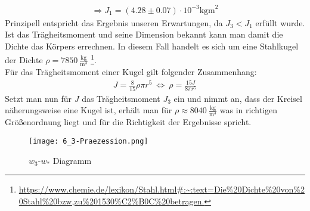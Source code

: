 \begin{align*}
    \Rightarrow\boxed{J_1=(4.28\pm0.07)\cdot10^{-3}\text{kgm}^2}
\end{align*}
Prinzipell entspricht das Ergebnis unseren Erwartungen, da $J_3<J_1$ erfüllt wurde. Ist das Trägheitsmoment und seine Dimension bekannt kann man damit die Dichte das Körpers errechnen. In diesem Fall handelt es sich um eine Stahlkugel der Dichte $\rho = 7850~\frac{\text{kg}}{\text{m}^3}$ \footnote{\url{https://www.chemie.de/lexikon/Stahl.html#:~:text=Die%20Dichte%20von%20Stahl%20bzw,zu%201530%C2%B0C%20betragen.}}.\\
Für das Trägheitsmoment einer Kugel gilt folgender Zusammenhang:
\begin{align}
    J=\frac{8}{15}\rho\pi r^5 ~\Leftrightarrow~ \rho=\frac{15 J}{8\pi r^5}
\end{align}
Setzt man nun für $J$ das Trägheitsmoment $J_3$ ein und nimmt an, dass der Kreisel näherungsweise eine Kugel ist, erhält man für $\rho\approx8040~\frac{\text{kg}}{\text{m}^3}$ was in richtigen Größenordnung liegt und für die Richtigkeit der Ergebnisse spricht.
\newpage
\begin{figure}[ht]
    \centering
    \caption{$w_3$-$w_*$ Diagramm}
    \texttt{[image: 6\_3-Praezession.png]}
\end{figure}
